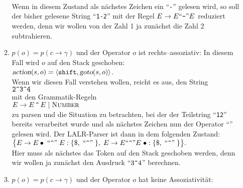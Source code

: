 \begin{enumerate}
\begin{enumerate}
            \\[0.2cm]
            Wenn in diesem Zustand als n\"achstes Zeichen ein ``\texttt{-}'' gelesen wird, so soll
            der bisher gelesene String ``\texttt{1-2}'' mit der Regel 
            $E \rightarrow E \mbox{``\texttt{-}''} E$ reduziert werden, denn wir wollen von der Zahl 1 ja
            zun\"achst die Zahl 2 subtrahieren.  
      \item $p(o) = p(c \rightarrow \gamma)$ und der Operator $o$ ist rechts--assoziativ:
            In diesem Fall wird $o$ auf den
            Stack geschoben:
            \\[0.2cm]
            \hspace*{1.3cm}
            $\textsl{action}(s,o) = \langle \texttt{shift}, \textsl{goto}(s,o) \rangle$.
            \\[0.2cm]
            Wenn wir diesen Fall verstehen wollen, reicht es aus, den String
            \\[0.2cm]
            \hspace*{1.3cm}
            $\texttt{2\symbol{94}3\symbol{94}4}$
            \\[0.2cm]
            mit den Grammatik-Regeln
            \\[0.2cm]
            \hspace*{1.3cm}
            $E \rightarrow E \,\texttt{\symbol{94}}\, E \mid \textsc{Number}$
            \\[0.2cm]
            zu parsen und die Situation zu betrachten, bei der der Teilstring
            ``\texttt{12}'' bereits verarbeitet wurde und als n\"achstes Zeichen nun
            der Operator ``\texttt{}'' gelesen wird.
            Der LALR-Parser ist dann in dem folgenden Zustand:
            \\[0.2cm]
            \hspace*{1.3cm}
            $\bigl\{ 
             E  \rightarrow E \bullet \quoted{\texttt{\symbol{94}}} E:
             \{\symbol{36},\quoted{\texttt{\symbol{94}}} \},\;  E \rightarrow  E
             \squoted{\texttt{\symbol{94}}} E \;\bullet: \{\symbol{36},\quoted{\texttt{\symbol{94}}}\}
            \bigr\}.
            $
            \\[0.2cm]
            Hier muss als n\"achstes das Token  auf den Stack geschoben
            werden, denn wir wollen ja zun\"achst den Ausdruck ``$3 \texttt{\symbol{94}} 4$'' berechnen.
      \item $p(o) = p(c \rightarrow \gamma)$ und der Operator $o$ hat keine Assoziativit\"at:

\end{enumerate}
\end{enumerate}
